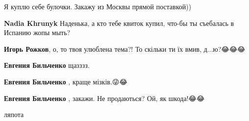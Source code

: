 \begin{itemize}
\begin{itemize}
Я куплю себе булочки. Закажу из Москвы прямой поставкой))

 
\textbf{Nadia Khrunyk} Наденька, а кто тебе квиток купил, что-бы ты съебалась в Испанию жопы мыть?

 
\textbf{Игорь Рожков}, о, то твоя улюблена тема?! То скільки ти їх вмив, д...ю?😂😂😂

 
\textbf{Евгения Бильченко} щазззз.

 
\textbf{Евгения Бильченко} , краще мізків.😜😂

 
\textbf{Евгения Бильченко} , закажи. Не продаються? Ой, як шкода!😂😂
\end{itemize}

 
ляпота

 

\end{itemize}
